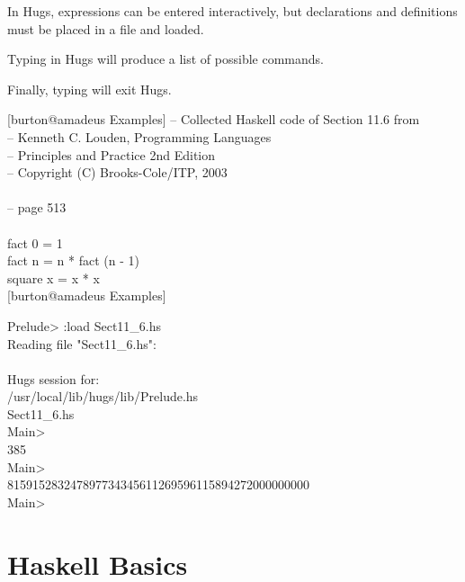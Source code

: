 \documentclass{seminar}
\begin{document}
\begin{slide}
\newslide

In Hugs, expressions can be entered interactively,
but declarations and definitions must be placed in
a file and loaded.

Typing  in Hugs will produce a list of
possible commands.

Finally, typing  will exit Hugs.

\newslide

\begin{code}
\color{SystemColor}
[burton@amadeus Examples]%
\color{SystemColor}
-- Collected Haskell code of Section 11.6 from\\
\color{SystemColor}
-- Kenneth C. Louden, Programming Languages\\
\color{SystemColor}
-- Principles and Practice 2nd Edition\\
\color{SystemColor}
-- Copyright (C) Brooks-Cole/ITP, 2003\\
\\
\color{SystemColor}
-- page 513\\
\\
\color{SystemColor}
fact 0 = 1\\
\color{SystemColor}
fact n = n * fact (n - 1)\\
\color{SystemColor}
square x = x * x\\
\color{SystemColor}
[burton@amadeus Examples]%
\end{code}

\newslide
\begin{code}[SystemColor]
Prelude>\color{CodeColor} :load Sect11\_6.hs\\
Reading file "Sect11\_6.hs":\\
                   \\
Hugs session for:\\
/usr/local/lib/hugs/lib/Prelude.hs\\
Sect11\_6.hs\\
Main>\\
385\\
Main>\\
815915283247897734345611269596115894272000000000\\
Main> 
\end{code}

\newslide

\section*{Haskell Basics}


\end{slide}
\end{document}

